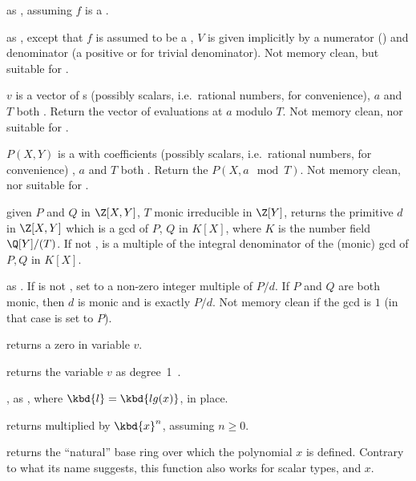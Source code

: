  as , assuming $f$
is a .

 as ,
except that $f$ is assumed to be a , $V$ is given implicitly
by a numerator  () and denominator  (a positive
 or  for trivial denominator). Not memory clean, but
suitable for .

 $v$ is a vector of s
(possibly scalars, i.e.~rational numbers, for convenience), $a$ and $T$ both
. Return the vector of evaluations at $a$ modulo $T$.
Not memory clean, nor suitable for .

 $P(X,Y)$ is a  with
 coefficients (possibly scalars, i.e.~rational numbers, for
convenience) , $a$ and $T$ both . Return the  $P(X, a \mod
T)$. Not memory clean, nor suitable for .

 given $P$ and $Q$ in
$\Z[X,Y]$, $T$ monic irreducible in $\Z[Y]$, returns the primitive $d$ in
$\Z[X,Y]$ which is a gcd of $P$, $Q$ in $K[X]$, where $K$ is the number field
$\Q[Y]/(T)$. If not ,  is a multiple of the integral
denominator of the (monic) gcd of $P,Q$ in $K[X]$.

 as .
If  is not , set  to a non-zero integer
multiple of $P/d$. If $P$ and $Q$ are both monic, then $d$ is monic and
 is exactly $P/d$. Not memory clean if the gcd is $1$
(in that case  is set to $P$).


 returns a zero  in variable $v$.

 returns the variable $v$ as degree~1~.

, as , where
$\kbd{l} = \kbd{lg(x)}$, in place.

 returns 
multiplied by $\kbd{x}^n$, assuming $n\geq 0$.



 returns
the ``natural'' base ring over which the polynomial $x$ is defined. Contrary
to what its name suggests, this function also works for scalar types,
 and  $x$.

